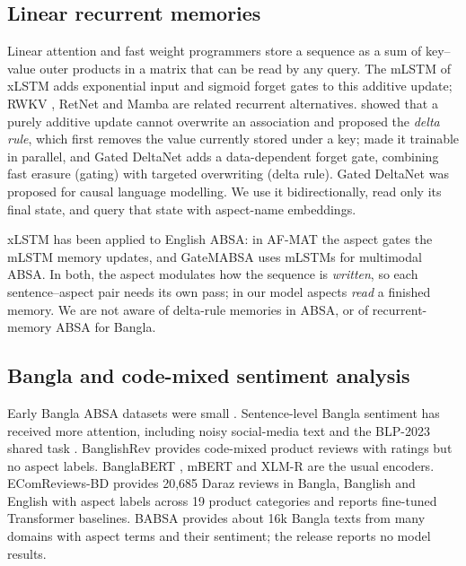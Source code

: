 \documentclass[11pt]{article}
\begin{document}
\subsection{Linear recurrent memories}
Linear attention \citep{katharopoulos2020transformers} and fast weight programmers
\citep{schlag2021fastweights} store a sequence as a sum of key--value outer products in a matrix that
can be read by any query. The mLSTM of xLSTM \citep{beck2024xlstm,beck2025xlstm7b} adds exponential
input and sigmoid forget gates to this additive update; RWKV \citep{peng2023rwkv}, RetNet
\citep{sun2023retnet} and Mamba \citep{gu2023mamba,dao2024mamba2} are related recurrent alternatives.
\citet{schlag2021fastweights} showed that a purely additive update cannot overwrite an association and
proposed the \emph{delta rule}, which first removes the value currently stored under a key;
\citet{yang2024deltanet} made it trainable in parallel, and Gated DeltaNet \citep{yang2025gdn} adds a
data-dependent forget gate, combining fast erasure (gating) with targeted overwriting (delta rule).
Gated DeltaNet was proposed for causal language modelling. We use it bidirectionally, read only its
final state, and query that state with aspect-name embeddings.

xLSTM has been applied to English ABSA: in AF-MAT \citep{lawan2025afmat} the aspect gates the mLSTM
memory updates, and GateMABSA \citep{lawan2025gatemabsa} uses mLSTMs for multimodal ABSA. In both, the
aspect modulates how the sequence is \emph{written}, so each sentence--aspect pair needs its own pass;
in our model aspects \emph{read} a finished memory. We are not aware of delta-rule memories in ABSA, or
of recurrent-memory ABSA for Bangla.

\subsection{Bangla and code-mixed sentiment analysis}
Early Bangla ABSA datasets were small \citep{rahman2018banglaabsa,masum2020banabsa}. Sentence-level
Bangla sentiment has received more attention, including noisy social-media text
\citep{islam2021sentnob} and the BLP-2023 shared task \citep{hasan2023blp}. BanglishRev
\citep{shamael2024banglishrev} provides code-mixed product reviews with ratings but no aspect labels.
BanglaBERT \citep{bhattacharjee2022banglabert}, mBERT \citep{devlin2019bert} and XLM-R
\citep{conneau2020xlmr} are the usual encoders. EComReviews-BD \citep{haque2026ecomreviews} provides
20,685 Daraz reviews in Bangla, Banglish and English with aspect labels across 19 product categories
and reports fine-tuned Transformer baselines. BABSA \citep{rohman2025babsa} provides about 16k Bangla
texts from many domains with aspect terms and their sentiment; the release reports no model results.
\end{document}
